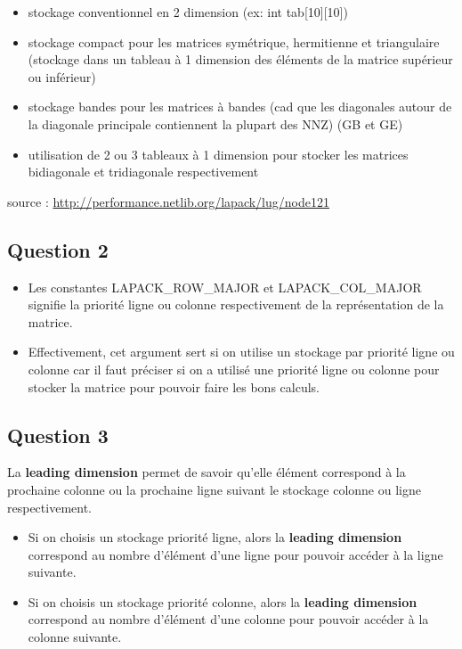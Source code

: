 \documentclass[11pt]{article}
\begin{document}
\begin{itemize}
\item stockage conventionnel en 2 dimension (ex: int tab[10][10])
\item stockage compact pour les matrices symétrique, hermitienne et
  triangulaire (stockage dans un tableau à 1 dimension des éléments
  de la matrice supérieur ou inférieur)
\item stockage bandes pour les matrices à bandes (cad que les
  diagonales autour de la diagonale principale contiennent la
  plupart des NNZ) (GB et GE)
\item utilisation de 2 ou 3 tableaux à 1 dimension pour stocker les
  matrices bidiagonale et tridiagonale respectivement
\end{itemize}

source : \url{http://performance.netlib.org/lapack/lug/node121}

\subsection{Question 2}

\begin{itemize}
\item Les constantes LAPACK\_ROW\_MAJOR et LAPACK\_COL\_MAJOR
  signifie la priorité ligne ou colonne respectivement de la
  représentation de la matrice.
\item Effectivement, cet argument sert si on utilise un stockage
  par priorité ligne ou colonne car il faut préciser si on a utilisé
  une priorité ligne ou colonne pour stocker la matrice pour pouvoir
  faire les bons calculs.
\end{itemize}

\subsection{Question 3}
   
La \textbf{leading dimension} permet de savoir qu'elle élément correspond
à la prochaine colonne ou la prochaine ligne suivant le stockage
colonne ou ligne respectivement.

\begin{itemize}
\item Si on choisis un stockage priorité ligne, alors la \textbf{leading dimension}
  correspond au nombre d'élément d'une ligne pour
  pouvoir accéder à la ligne suivante.
\item Si on choisis un stockage priorité colonne, alors la \textbf{leading dimension}
  correspond au nombre d'élément d'une colonne pour
  pouvoir accéder à la colonne suivante.
\end{itemize}
\end{document}
